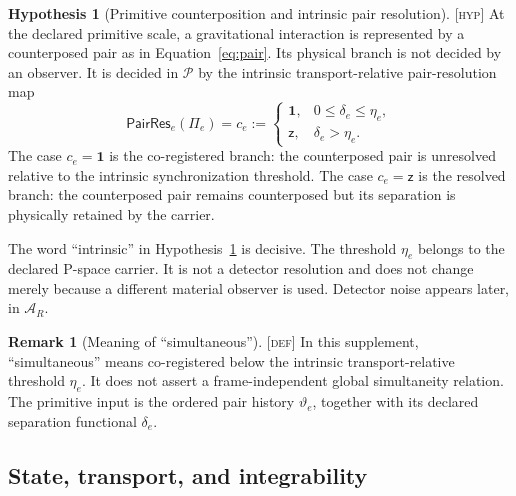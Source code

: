 \documentclass[11pt]{article}
\newcommand{\Pspace}{\ensuremath{\mathcal P}}
\newcommand{\ARspace}{\ensuremath{\mathcal A_R}}
\newcommand{\Id}{\ensuremath{\mathbf 1}}
\newcommand{\zinv}{\ensuremath{\mathsf z}}
\newcommand{\Pair}{\ensuremath{\Pi}}
\newcommand{\PairRes}{\ensuremath{\mathsf{PairRes}}}
\newcommand{\Defn}{\textsc{[def]}}
\newcommand{\Hyp}{\textsc{[hyp]}}
\theoremstyle{definition}
\newtheorem{hypothesis}[definition]{Hypothesis}
\newtheorem{remark}[definition]{Remark}
\begin{document}
\begin{hypothesis}[Primitive counterposition and intrinsic pair resolution]
\label{hyp:pair-resolution}
\Hyp{} At the declared primitive scale, a gravitational interaction is represented
by a counterposed pair as in Equation~\eqref{eq:pair}.  Its physical branch is
not decided by an observer.  It is decided in \Pspace{} by the intrinsic
transport-relative pair-resolution map
\begin{equation}
\PairRes_e(\Pair_e)=c_e:=
\begin{cases}
\Id, & 0\le \delta_e\le \eta_e,\\[2mm]
\zinv, & \delta_e>\eta_e.
\end{cases}
\label{eq:pair-resolution}
\end{equation}
The case $c_e=\Id$ is the co-registered branch: the counterposed pair is
unresolved relative to the intrinsic synchronization threshold.  The case
$c_e=\zinv$ is the resolved branch: the counterposed pair remains counterposed
but its separation is physically retained by the carrier.
\end{hypothesis}

The word ``intrinsic'' in Hypothesis~\ref{hyp:pair-resolution} is decisive.  The
threshold $\eta_e$ belongs to the declared P-space carrier.  It is not a detector
resolution and does not change merely because a different material observer is
used.  Detector noise appears later, in $\ARspace$.

\begin{remark}[Meaning of ``simultaneous'']
\label{rem:simultaneous}
\Defn{} In this supplement, ``simultaneous'' means co-registered below the
intrinsic transport-relative threshold $\eta_e$.  It does not assert a
frame-independent global simultaneity relation.  The primitive input is the
ordered pair history $\vartheta_e$, together with its declared separation
functional $\delta_e$.
\end{remark}

\subsection{State, transport, and integrability}
\end{document}
